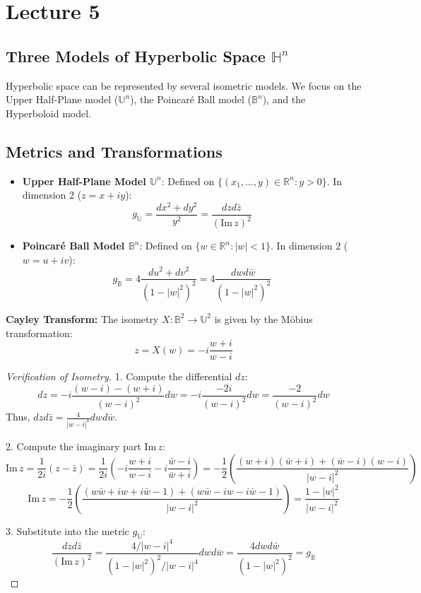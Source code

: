 \documentclass[11pt, a4paper]{article}
\theoremstyle{plain}
\theoremstyle{definition}
\theoremstyle{remark}
\begin{document}
\section{Lecture 5}

\subsection{Three Models of Hyperbolic Space $\mathbb{H}^n$}

Hyperbolic space can be represented by several isometric models. We focus on the Upper Half-Plane model ($\mathbb{U}^n$), the Poincaré Ball model ($\mathbb{B}^n$), and the Hyperboloid model.

\subsection*{Metrics and Transformations}

\begin{itemize}
    \item \textbf{Upper Half-Plane Model $\mathbb{U}^n$}: 
    Defined on $\{ (x_1, \dots, y) \in \mathbb{R}^n : y > 0 \}$. In dimension 2 ($z = x + iy$):
    \[ g_{\mathbb{U}} = \frac{dx^2 + dy^2}{y^2} = \frac{dz d\bar{z}}{(\text{Im}\, z)^2} \]
    
    \item \textbf{Poincaré Ball Model $\mathbb{B}^n$}: 
    Defined on $\{ w \in \mathbb{R}^n : |w| < 1 \}$. In dimension 2 ($w = u + iv$):
    \[ g_{\mathbb{B}} = 4 \frac{du^2 + dv^2}{(1 - |w|^2)^2} = 4 \frac{dw d\bar{w}}{(1 - |w|^2)^2} \]
\end{itemize}

\textbf{Cayley Transform:} The isometry $X: \mathbb{B}^2 \to \mathbb{U}^2$ is given by the Möbius transformation:
\[ z = X(w) = -i \frac{w + i}{w - i} \]

\begin{proof}[Verification of Isometry]
1. Compute the differential $dz$:
\[ dz = -i \frac{(w-i) - (w+i)}{(w-i)^2} dw = -i \frac{-2i}{(w-i)^2} dw = \frac{-2}{(w-i)^2} dw \]
Thus, $dz d\bar{z} = \frac{4}{|w-i|^4} dw d\bar{w}$.

2. Compute the imaginary part $\text{Im}\, z$:
\[ \text{Im}\, z = \frac{1}{2i} (z - \bar{z}) = \frac{1}{2i} \left( -i \frac{w+i}{w-i} - i \frac{\bar{w}-i}{\bar{w}+i} \right) = - \frac{1}{2} \left( \frac{(w+i)(\bar{w}+i) + (\bar{w}-i)(w-i)}{|w-i|^2} \right) \]
\[ \text{Im}\, z = - \frac{1}{2} \left( \frac{(w\bar{w} + iw + i\bar{w} - 1) + (w\bar{w} - iw - i\bar{w} - 1)}{|w-i|^2} \right) = \frac{1 - |w|^2}{|w-i|^2} \]

3. Substitute into the metric $g_{\mathbb{U}}$:
\[ \frac{dz d\bar{z}}{(\text{Im}\, z)^2} = \frac{4 / |w-i|^4}{(1-|w|^2)^2 / |w-i|^4} dw d\bar{w} = \frac{4 dw d\bar{w}}{(1-|w|^2)^2} = g_{\mathbb{B}} \]
\end{proof}
\end{document}
